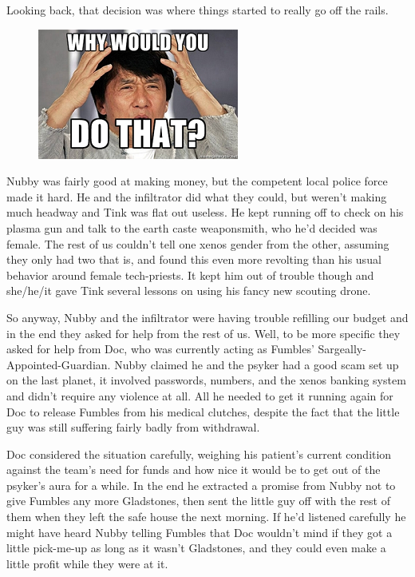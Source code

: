 Looking back, that decision was where things started to really go off the rails.

\begin{figure}
	\begin{center}
		\includegraphics[width=\figwidth]{pics/10/40.png}
	\end{center}
\end{figure}
Nubby was fairly good at making money, but the competent local police force made it hard. 
He and the infiltrator did what they could, but weren't making much headway and Tink was flat out useless. 
He kept running off to check on his plasma gun and talk to the earth caste weaponsmith, who he'd decided was female. 
The rest of us couldn't tell one xenos gender from the other, assuming they only had two that is, and found this even more revolting than his usual behavior around female tech-priests. 
It kept him out of trouble though and she/he/it gave Tink several lessons on using his fancy new scouting drone.

So anyway, Nubby and the infiltrator were having trouble refilling our budget and in the end they asked for help from the rest of us. 
Well, to be more specific they asked for help from Doc, who was currently acting as Fumbles' Sargeally-Appointed-Guardian. 
Nubby claimed he and the psyker had a good scam set up on the last planet, it involved passwords, numbers, and the xenos banking system and didn't require any violence at all. 
All he needed to get it running again for Doc to release Fumbles from his medical clutches, despite the fact that the little guy was still suffering fairly badly from withdrawal.

Doc considered the situation carefully, weighing his patient's current condition against the team's need for funds and how nice it would be to get out of the psyker's aura for a while. 
In the end he extracted a promise from Nubby not to give Fumbles any more Gladstones, then sent the little guy off with the rest of them when they left the safe house the next morning. 
If he'd listened carefully he might have heard Nubby telling Fumbles that Doc wouldn't mind if they got a little pick-me-up as long as it wasn't Gladstones, and they could even make a little profit while they were at it.

